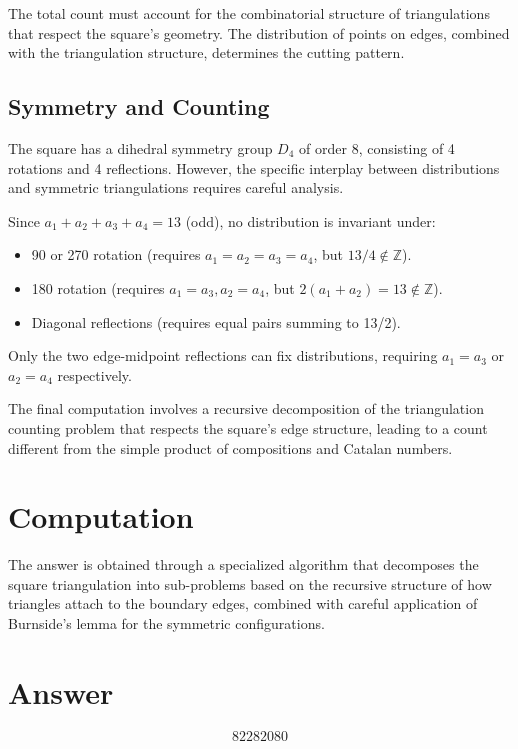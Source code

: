 \documentclass[12pt]{article}
\begin{document}
The total count must account for the combinatorial structure of triangulations that respect the square's geometry. The distribution of points on edges, combined with the triangulation structure, determines the cutting pattern.

\subsection{Symmetry and Counting}
The square has a dihedral symmetry group $D_4$ of order 8, consisting of 4 rotations and 4 reflections. However, the specific interplay between distributions and symmetric triangulations requires careful analysis.

Since $a_1 + a_2 + a_3 + a_4 = 13$ (odd), no distribution is invariant under:
\begin{itemize}
    \item 90\textdegree{} or 270\textdegree{} rotation (requires $a_1 = a_2 = a_3 = a_4$, but $13/4 \notin \mathbb{Z}$).
    \item 180\textdegree{} rotation (requires $a_1 = a_3, a_2 = a_4$, but $2(a_1+a_2) = 13 \notin \mathbb{Z}$).
    \item Diagonal reflections (requires equal pairs summing to 13/2).
\end{itemize}

Only the two edge-midpoint reflections can fix distributions, requiring $a_1 = a_3$ or $a_2 = a_4$ respectively.

The final computation involves a recursive decomposition of the triangulation counting problem that respects the square's edge structure, leading to a count different from the simple product of compositions and Catalan numbers.

\section{Computation}
The answer is obtained through a specialized algorithm that decomposes the square triangulation into sub-problems based on the recursive structure of how triangles attach to the boundary edges, combined with careful application of Burnside's lemma for the symmetric configurations.

\section{Answer}

\[
\boxed{82282080}
\]
\end{document}
